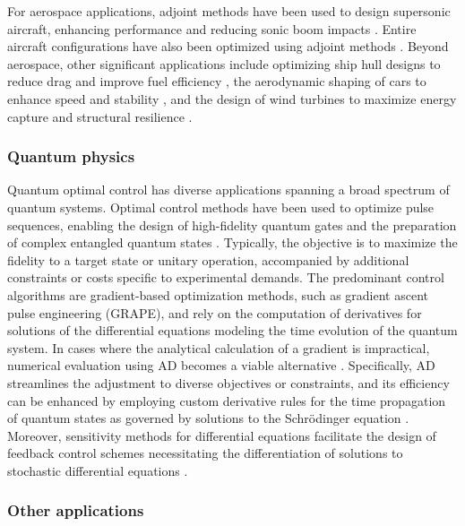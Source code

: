 For aerospace applications, adjoint methods have been used to design supersonic aircraft, enhancing performance and reducing sonic boom impacts \cite{hu2010supersonic,fike2013multi}. 
Entire aircraft configurations have also been optimized using adjoint methods \cite{chen2016aerodynamic}. 
Beyond aerospace, other significant applications include optimizing ship hull designs to reduce drag and improve fuel efficiency \cite{kroger2018ships}, the aerodynamic shaping of cars to enhance speed and stability \cite{Othmer2014caraerodynamics}, and the design of wind turbines to maximize energy capture and structural resilience \cite{dhert2017aerodynamic}.

\subsubsection{Quantum physics}

Quantum optimal control has diverse applications spanning a broad spectrum of quantum systems. 
Optimal control methods have been used to optimize pulse sequences, enabling the design of high-fidelity quantum gates and the preparation of complex entangled quantum states \cite{koch2022quantum}. 
Typically, the objective is to maximize the fidelity to a target state or unitary operation, accompanied by additional constraints or costs specific to experimental demands. 
The predominant control algorithms are gradient-based optimization methods, such as gradient ascent pulse engineering (GRAPE), and rely on the computation of derivatives for solutions of the differential equations modeling the time evolution of the quantum system. 
In cases where the analytical calculation of a gradient is impractical, numerical evaluation using AD becomes a viable alternative \cite{jirari:2009, leung:2017, abdelhafez:2019, jirari2019quantum, abdelhafez:2020, schaefer:2020, goerz:2022}. 
Specifically, AD streamlines the adjustment to diverse objectives or constraints, and its efficiency can be enhanced by employing custom derivative rules for the time propagation of quantum states as governed by solutions to the Schrödinger equation \cite{goerz:2022}. 
Moreover, sensitivity methods for differential equations facilitate the design of feedback control schemes necessitating the differentiation of solutions to stochastic differential equations \cite{schaefer:2021}.

\subsubsection{Other applications}

